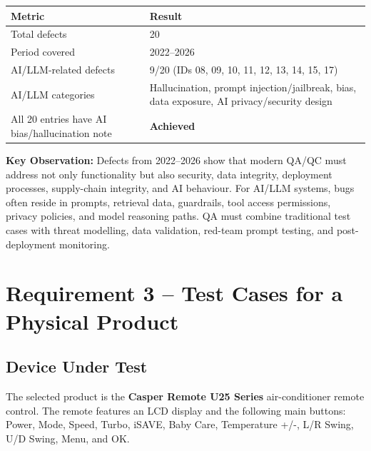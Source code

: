 \documentclass[12pt, a4paper]{article}
\newcommand{\achieved}{\textcolor{PassGreen}{\textbf{Achieved}}}
\begin{document}
\begin{table}[h!]
\centering
\begin{tabularx}{\textwidth}{@{} X C{3.5cm} @{}}
\toprule
{}
\textbf{Metric} & \textbf{Result} \\
\midrule
Total defects & 20 \\
Period covered & 2022--2026 \\
AI/LLM-related defects & 9/20 (IDs 08, 09, 10, 11, 12, 13, 14, 15, 17) \\
AI/LLM categories & Hallucination, prompt injection/jailbreak, bias, data exposure, AI privacy/security design \\
All 20 entries have AI bias/hallucination note & \achieved \\
\bottomrule
\end{tabularx}
\end{table}

\begin{infobox}
\textbf{Key Observation:} Defects from 2022--2026 show that modern QA/QC must address not only functionality but also security, data integrity, deployment processes, supply-chain integrity, and AI behaviour. For AI/LLM systems, bugs often reside in prompts, retrieval data, guardrails, tool access permissions, privacy policies, and model reasoning paths. QA must combine traditional test cases with threat modelling, data validation, red-team prompt testing, and post-deployment monitoring.
\end{infobox}

\section{Requirement 3 -- Test Cases for a Physical Product}

\subsection{Device Under Test}

The selected product is the \textbf{Casper Remote U25 Series} air-conditioner remote control. The remote features an LCD display and the following main buttons: Power, Mode, Speed, Turbo, iSAVE, Baby Care, Temperature +/-, L/R Swing, U/D Swing, Menu, and OK.
\end{document}
